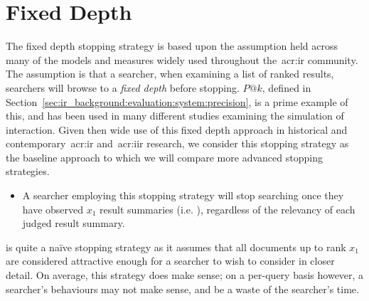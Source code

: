 \section{Fixed Depth}\label{sec:strategies:fixed}
The fixed depth stopping strategy is based upon the assumption held across many of the models and measures widely used throughout the~\gls{acr:ir} community. The assumption is that a searcher, when examining a list of ranked results, searchers will browse to a \emph{fixed depth} before stopping. $P@k$, defined in Section~\ref{sec:ir_background:evaluation:system:precision}, is a prime example of this, and has been used in many different studies examining the simulation of interaction. Given then wide use of this fixed depth approach in historical and contemporary~\gls{acr:ir} and~\gls{acr:iir} research, we consider this stopping strategy as the baseline approach to which we will compare more advanced stopping strategies.

\begin{itemize}
    \item{} A searcher employing this stopping strategy will stop searching once they have observed $x_1$ result summaries (i.e. ), regardless of the relevancy of each judged result summary.
\end{itemize}

 is quite a na\"{i}ve stopping strategy as it assumes that all documents up to rank $x_1$ are considered attractive enough for a searcher to wish to consider in closer detail. On average, this strategy does make sense; on a per-query basis however, a searcher's behaviours may not make sense, and be a waste of the searcher's time.


